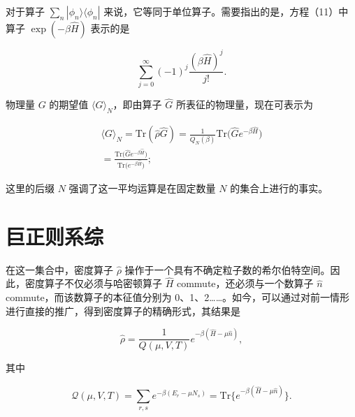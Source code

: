 对于算子 \(\sum_{n}|\phi_{n}\rangle\langle\phi_{n}|\) 来说，它等同于单位算子。需要指出的是，方程（11）中算子 \(\exp(-\beta\hat{H})\) 表示的是

\begin{equation}\tag{5.2.12}\label{eq:5.2.12}
\sum _ { j = 0 } ^{\infty} ( - 1 ) ^{j} \frac { ( \beta \hat { H } ) ^{j} } { j ! } .
\end{equation}

物理量 \(G\) 的期望值 \(\langle G\rangle_{N}\)，即由算子 \(\hat{G}\) 所表征的物理量，现在可表示为

\begin{equation}\tag{5.2.13}\label{eq:5.2.13}
\begin{array}{r} { \langle G \rangle _ { N } = \mathrm { T r } ( \hat { \rho } \hat { G } ) = \frac { 1 } { Q _ { N } ( \beta ) } \mathrm { T r } \big ( \hat { G } e ^{- \beta \hat { H} } \big ) } \\{ = \frac { \mathrm { T r } \big ( \hat { G } e ^{- \beta \hat { H} } \big ) } { \mathrm { T r } \big ( e ^{- \beta \hat { H} } \big ) } ; } \end{array}
\end{equation}

这里的后缀 \(N\) 强调了这一平均运算是在固定数量 \(N\) 的集合上进行的事实。

\section{巨正则系综}\label{c-ux5927ux5747ux503cux96c6ux5408}

在这一集合中，密度算子 \(\hat{\rho}\) 操作于一个具有不确定粒子数的希尔伯特空间。因此，密度算子不仅必须与哈密顿算子 \(\hat{H}\) commute，还必须与一个数算子 \(\hat{n}\) commute，而该数算子的本征值分别为 0、1、2\ldots\ldots。如今，可以通过对前一情形进行直接的推广，得到密度算子的精确形式，其结果是

\begin{equation}\tag{5.2.14}\label{eq:5.2.14}
\hat { \rho } = \frac { 1 } { Q ( \mu , V , T ) } e ^{- \beta ( \hat { H} - \mu \hat { n } ) } ,
\end{equation}

其中

\begin{equation}\tag{5.2.15}\label{eq:5.2.15}
\mathcal { Q } ( \mu , V , T ) = \sum _ { r , s } e ^{- \beta ( E _ { r} - \mu N _ { s } ) } = \mathrm { T r } \{ e ^{- \beta ( \hat { H} - \mu \hat { n } ) } \} .
\end{equation}

